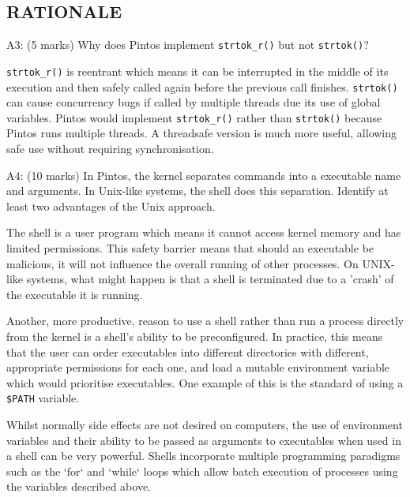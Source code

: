 

\subsection*{RATIONALE}

\noindent A3: (5 marks)
Why does Pintos implement \texttt{strtok\_r()} but not \texttt{strtok()}?


\texttt{strtok\_r()} is reentrant which means it can be interrupted in the middle of its execution and then safely called again before the previous call finishes. \texttt{strtok()} can cause concurrency bugs if called by multiple threads due its use of global variables. Pintos would implement \texttt{strtok\_r()} rather than \texttt{strtok()} because Pintos runs multiple threads. A threadsafe version is much more useful, allowing safe use without requiring synchronisation.


\noindent A4: (10 marks)
In Pintos, the kernel separates commands into a executable name
and arguments.  In Unix-like systems, the shell does this
separation.  Identify at least two advantages of the Unix approach.


The shell is a user program which means it cannot access kernel memory and has limited permissions. This safety barrier means that should an executable be malicious, it will not influence the overall running of other processes. On UNIX-like systems, what might happen is that a shell is terminated due to a 'crash' of the executable it is running.

Another, more productive, reason to use a shell rather than run a process directly from the kernel is a shell's ability to be preconfigured. In practice, this means that the user can order executables into different directories with different, appropriate permissions for each one, and load a mutable environment variable which would prioritise executables. One example of this is the standard of using a \texttt{\$PATH} variable.

Whilst normally side effects are not desired on computers, the use of environment variables and their ability to be passed as arguments to executables when used in a shell can be very powerful. Shells incorporate multiple programming paradigms such as the `for` and `while` loops which allow batch execution of processes using the variables described above.






